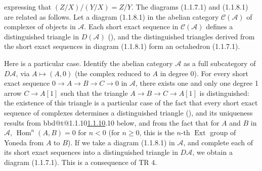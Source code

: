 \documentclass[12pt,oneside]{amsbook}
\makeatletter
\DeclareRobustCommand{\rn}[1]{%
  \ifcsname bbd@t@#1\endcsname\hyperlink{bbd:#1}{#1}\else#1\fi}
\theoremstyle{plain}
\theoremstyle{definition}
\makeatother
\begin{document}
{\begin{center}
\end{center}}

expressing that \( (Z/X)/(Y/X) = Z/Y \). The diagrams (1.1.7.1) and (1.1.8.1) are related as follows. Let a diagram (1.1.8.1) in the abelian category \( \mathcal{C}(\mathcal{A}) \) of complexes of objects in \( \mathcal{A} \). Each short exact sequence in \( \mathcal{C}(\mathcal{A}) \) defines a distinguished triangle in \( D(\mathcal{A}) \) (\cite[p.~31]{Verdier}), and the distinguished triangles derived from the short exact sequences in diagram (1.1.8.1) form an octahedron (1.1.7.1).

Here is a particular case. Identify the abelian category \( \mathcal{A} \) as a full subcategory of \( D\mathcal{A} \), via \( A \mapsto (A, 0) \) (the complex reduced to \( A \) in degree 0). For every short exact sequence \( 0 \to A \to B \to C \to 0 \) in \( \mathcal{A} \), there exists one and only one degree 1 arrow \( C \to A[1] \) such that the triangle \( A \to B \to C \to A[1] \) is distinguished: the existence of this triangle is a particular case of the fact that every short exact sequence of complexes determines a distinguished triangle (\cite[p.~31]{Verdier}), and its uniqueness results from \rn{1.1.10} below, and from the fact that for \( A \) and \( B \) in \( \mathcal{A} \), \( \operatorname{Hom}^n(A, B) = 0 \) for \( n < 0 \) (for \( n \ge 0 \), this is the $n$-th \( \operatorname{Ext} \) group of Yoneda from \( A \) to \( B \)). If we take a diagram (1.1.8.1) in \( \mathcal{A} \), and complete each of its short exact sequences into a distinguished triangle in \( D\mathcal{A} \), we obtain a diagram (1.1.7.1). This is a consequence of TR 4.
\end{document}
